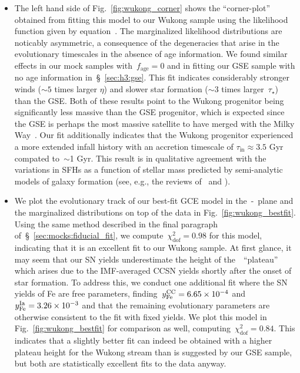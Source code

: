 \documentclass[ms.tex]{subfiles}
\begin{document}
\begin{itemize}
	\item The left hand side of Fig.~\ref{fig:wukong_corner} shows the
	``corner-plot'' obtained from fitting this model to our Wukong sample using
	the likelihood function given by equation~.
	The marginalized likelihood distributions are noticably asymmetric, a
	consequence of the degeneracies that arise in the evolutionary timescales
	in the absence of age information.
	We found similar effects in our mock samples with~$f_\text{age} = 0$ and
	in fitting our GSE sample with no age information in~\S~\ref{sec:h3:gse}.
	This fit indicates considerably stronger winds ($\sim5$ times larger
	$\eta$) and slower star formation ($\sim3$ times larger~$\tau_\star$) than
	the GSE.
	Both of these results point to the Wukong progenitor being significantly
	less massive than the GSE progenitor, which is expected since the GSE is
	perhaps the most massive satellite to have merged with the Milky
	Way~\citep{Deason2019, Fattahi2019, Mackereth2019, Vincenzo2019}.
	Our fit additionally indicates that the Wukong progenitor experienced a
	more extended infall history with an accretion timescale of
	$\tau_\text{in} \approx 3.5$ Gyr compated to~$\sim$1 Gyr.
	This result is in qualitative agreement with the variations in SFHs as a
	function of stellar mass predicted by semi-analytic models of galaxy
	formation (see, e.g., the reviews of~\citealt{Baugh2006} and
	\citet{Somerville2015a}).

	\item We plot the evolutionary track of our best-fit GCE model in
	the~\afe-\feh~plane and the marginalized distributions on top of the data
	in Fig.~\ref{fig:wukong_bestfit}.
	Using the same method described in the final paragraph
	of~\S~\ref{sec:mocks:fiducial_fit}, we compute~$\chi_\text{dof}^2 = 0.98$
	for this model, indicating that it is an excellent fit to our Wukong sample.
	At first glance, it may seem that our SN yields underestimate the height of
	the~\afe~``plateau'' which arises due to the IMF-averaged CCSN yields
	shortly after the onset of star formation.
	To address this, we conduct one additional fit where the SN yields of Fe
	are free parameters, finding~$y_\text{Fe}^\text{CC} = 6.65\times10^{-4}$ and
	$y_\text{Fe}^\text{Ia} = 3.26\times10^{-3}$ and that the remaining evolutionary
	parameters are otherwise consistent to the fit with fixed yields.
	We plot this model in Fig.~\ref{fig:wukong_bestfit} for comparison as well,
	computing~$\chi_\text{dof}^2 = 0.84$.
	This indicates that a slightly better fit can indeed be obtained with a
	higher plateau height for the Wukong stream than is suggested by our GSE
	sample, but both are statistically excellent fits to the data anyway.


\end{itemize}
\end{document}
